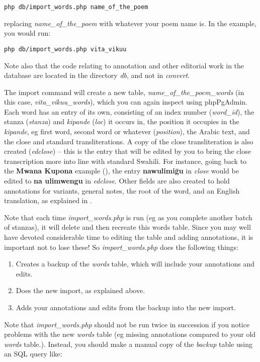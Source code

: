 \verb|php db/import_words.php name_of_the_poem|

replacing \textit{name_of_the_poem} with whatever your poem name is.  In the example, you would run:

\verb|php db/import_words.php vita_vikuu|

Note also that the code relating to annotation and other editorial work in the database are located in the directory \textit{db}, and not in \textit{convert}.

The import command will create a new table, \textit{name_of_the_poem_words} (in this case, \textit{vita_vikuu_words}), which you can again inspect using phpPgAdmin.  Each word has an entry of its own, consisting of an index number (\textit{word_id}), the stanza (\textit{stanza}) and \textit{kipande} (\textit{loc}) it occurs in, the position it occupies in the \textit{kipande}, eg first word, second word or whatever (\textit{position}), the Arabic text, and the close and standard transliterations.  A copy of the close transliteration is also created (\textit{edclose}) --  this is the entry that will be edited by you to bring the close transcription more into line with standard Swahili.  For instance, going back to the \textbf{Mwana Kupona} example (), the entry \textbf{nawulimiḡu} in \textit{close} would be edited to \textbf{na ulimwengu} in \textit{edclose}.  Other fields are also created to hold annotations for variants, general notes, the root of the word, and an English translation, as explained in .

Note that each time \textit{import_words.php} is run (eg as you complete another batch of stanzas), it will delete and then recreate this words table.  Since you may well have devoted considerable time to editing the table and adding annotations, it is important not to lose these!  So \textit{import_words.php} does the following things:
\begin{enumerate}
\item Creates a backup of the \textit{words} table, which will include your annotations and edits.
\item Does the new import, as explained above.
\item Adds your annotations and edits from the backup into the new import.
\end{enumerate}

Note that \textit{import_words.php} should not be run twice in succession if you notice problems with the new \textit{words} table (eg missing annotations compared to your old \textit{words} table.).  Instead, you should make a manual copy of the \textit{backup} table using an SQL query like:  

